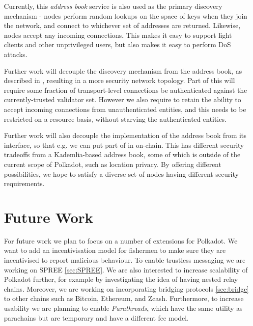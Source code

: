 \documentclass{article}
\begin{document}
Currently, this \emph{address book} service is also used as the primary discovery mechanism - nodes perform random lookups on the space of keys when they join the network, and connect to whichever set of addresses are returned. Likewise, nodes accept any incoming connections. This makes it easy to support light clients and other unprivileged users, but also makes it easy to perform DoS attacks.

Further work will decouple the discovery mechanism from the address book, as described in , resulting in a more security network topology. Part of this will require some fraction of transport-level connections be authenticated against the currently-trusted validator set. However we also require to retain the ability to accept incoming connections from unauthenticated entities, and this needs to be restricted on a resource basis, without starving the authenticated entities.

Further work will also decouple the implementation of the address book from its interface, so that e.g. we can put part of in on-chain. This has different security tradeoffs from a Kademlia-based address book, some of which is outside of the current scope of Polkadot, such as location privacy. By offering different possibilities, we hope to satisfy a diverse set of nodes having different security requirements.


\section{Future Work}\label{sec:futurework}
For future work we plan to focus on a number of extensions for Polkadot.
We want to add an incentivisation model for fishermen to make sure they are incentivised to report malicious behaviour. 
To enable trustless messaging we are working on SPREE \ref{sec:SPREE}. We are also interested to increase scalability of Polkadot further, for example by investigating the idea of having nested relay chains. Moreover, we are working on incorporating bridging protocols \ref{sec:bridge} to other chains  such as Bitcoin, Ethereum, and Zcash. Furthermore, to increase usability we are planning to enable \emph{Parathreads}, which have the same utility as parachains but are temporary and have a different fee model.

\end{document}
